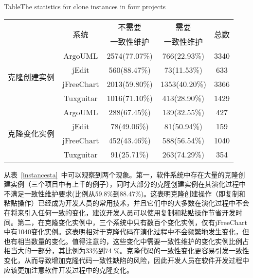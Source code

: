 \begin{table}[htbp]
{Table$\!$}{The statistics for clone instances in four projects}
\vspace{0.5em}
\centering
\wuhao
\begin{tabular}{ccccc}
\toprule[1.5pt]
~\multirow{2}{*}{类型}&\multirow{2}{*}{系统}&{不需要}&{需要} &\multirow{2}{*}{总数}\\
~&~&{一致性维护}&{一致性维护}&~\\
\midrule[1pt]
\multirow{4}{*}{克隆创建实例}
&ArgoUML&	2574(77.07\%)&	766(22.93\%)&	3340\\
&jEdit&560(88.47\%)&	73(11.53\%)&	633\\
&jFreeChart&	2013(59.80\%)&	1353(40.20\%)&	3366\\
&Tuxguitar&	1016(71.10\%)&	413(28.90\%)&	1429\\
\hline
\multirow{4}{*}{克隆变化实例}
&ArgoUML&288(67.45\%)&139(32.55\%)&427\\
&jEdit&78(49.06\%)&81(50.94\%)&159\\
&jFreeChart&452(43.46\%)&588(56.54\%)&1040\\
&Tuxguitar&91(25.71\%)&263(74.29\%)&354\\
\bottomrule[1.5pt]
\end{tabular}
\end{table}

从表~\ref{instancesta}~中可以观察到两个现象。第一，软件系统中存在大量的克隆创建实例（三个项目中有上千的例子），同时大部分的克隆创建实例在其演化过程中不满足一致性维护要求(比例从59.8\%到88.47\%)。这表明克隆创建操作（即复制和粘贴操作）已经成为开发人员的常用技术，并且它们中的大多数在演化过程中不会在将来引入任何一致的变化，建议开发人员可以使用复制和粘贴操作节省开发时间。第二，在克隆变化实例中，三个系统中只有数百个变化实例，仅有jFreeChart中有1040变化实例。这表明相对于克隆代码在演化过程中不会频繁地发生变化，但也有相当数量的变化。值得注意的，这些变化中需要一致性维护的变化实例比例占相当大的一部分，其比例为33\%到74 \%。克隆代码的一致性变化更容易引发一致性变化，从而导致增加克隆代码一致性缺陷的风险，因此开发人员在软件开发过程中应该更加注意软件开发过程中的克隆变化。

  
